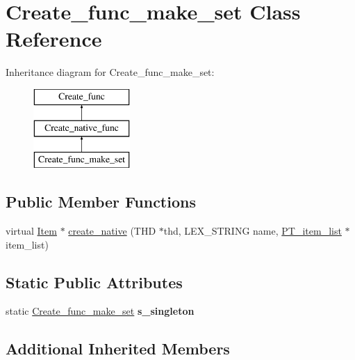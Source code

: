 \hypertarget{classCreate__func__make__set}{}\section{Create\+\_\+func\+\_\+make\+\_\+set Class Reference}
\label{classCreate__func__make__set}
Inheritance diagram for Create\+\_\+func\+\_\+make\+\_\+set\+:\begin{figure}[H]
\begin{center}
\leavevmode
\includegraphics[height=3.000000cm]{classCreate__func__make__set}
\end{center}
\end{figure}
\subsection*{Public Member Functions}
\begin{DoxyCompactItemize}
\item 
virtual \mbox{\hyperlink{classItem}{Item}} $\ast$ \mbox{\hyperlink{classCreate__func__make__set_a28f2047782d054b91b5ecf250a516de8}{create\+\_\+native}} (T\+HD $\ast$thd, L\+E\+X\+\_\+\+S\+T\+R\+I\+NG name, \mbox{\hyperlink{classPT__item__list}{P\+T\+\_\+item\+\_\+list}} $\ast$item\+\_\+list)
\end{DoxyCompactItemize}
\subsection*{Static Public Attributes}
\begin{DoxyCompactItemize}
\item 
\mbox{\label{classCreate__func__make__set_a30e57b1ce9c6481fd0f4c800224e5d02}} 
static \mbox{\hyperlink{classCreate__func__make__set}{Create\+\_\+func\+\_\+make\+\_\+set}} {\bfseries s\+\_\+singleton}
\end{DoxyCompactItemize}
\subsection*{Additional Inherited Members}


